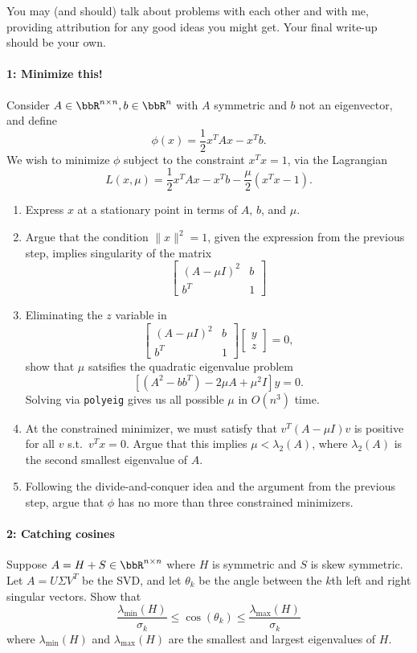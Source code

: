 \documentclass[12pt, leqno]{article} %
\begin{document}

You may (and should) talk about problems with each other and with me,
providing attribution for any good ideas you might get.  Your final
write-up should be your own.

\paragraph*{1: Minimize this!}
Consider $A \in \bbR^{n \times n}, b \in \bbR^n$ with $A$ symmetric
and $b$ not an eigenvector, and define
\[
  \phi(x) = \frac{1}{2} x^T A x - x^T b.
\]
We wish to minimize $\phi$ subject to the constraint $x^T x = 1$,
via the Lagrangian
\[
  L(x,\mu) = \frac{1}{2} x^T A x - x^T b - \frac{\mu}{2} (x^T x - 1).
\]
\begin{enumerate}
\item Express $x$ at a stationary point in terms
  of $A$, $b$, and $\mu$.
\item Argue that the condition $\|x\|^2 = 1$, given the expression
  from the previous step, implies
  singularity of the matrix
  \[
    \begin{bmatrix} (A-\mu I)^2 & b \\ b^T & 1 \end{bmatrix}
  \]
\item
  Eliminating the $z$ variable in
  \[
    \begin{bmatrix}
      (A-\mu I)^2 & b \\
      b^T & 1
    \end{bmatrix}
    \begin{bmatrix} y \\ z \end{bmatrix} = 0,
  \]
  show that $\mu$ satsifies the quadratic eigenvalue problem
  \[
    \left[ (A^2-bb^T) - 2 \mu A + \mu^2 I \right] y = 0.
  \]
  Solving via {\tt polyeig} gives
  us all possible $\mu$ in $O(n^3)$ time.
\item
  At the constrained minimizer, we must satisfy that
  $v^T (A-\mu I) v$ is positive for all $v$ s.t.~$v^T x = 0$.
  Argue that this implies $\mu < \lambda_2(A)$, where $\lambda_2(A)$
  is the second smallest eigenvalue of $A$.
\item
  Following the divide-and-conquer idea and the argument
  from the previous step, argue that $\phi$
  has no more than three constrained minimizers.
\end{enumerate}

\paragraph*{2: Catching cosines}
Suppose $A = H+S \in \bbR^{n \times n}$ where $H$ is symmetric
and $S$ is skew symmetric.  Let $A = U \Sigma V^T$ be the SVD,
and let $\theta_k$ be the angle between the $k$th left and right
singular vectors.  Show that
\[
  \frac{\lambda_{\min}(H)}{\sigma_k} \leq \cos(\theta_k) \leq \frac{\lambda_{\max}(H)}{\sigma_k}
\]
where $\lambda_{\min}(H)$ and $\lambda_{\max}(H)$ are the smallest and largest
eigenvalues of $H$.
\end{document}
